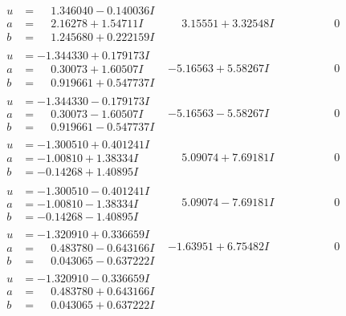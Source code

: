 \documentclass[1p]{elsarticle_modified}
\theoremstyle{definition}
\begin{document}
$$\begin{array}{c|c|c}
\begin{aligned}
u &= \phantom{-}1.346040 - 0.140036 I \\
a &= \phantom{-}2.16278 + 1.54711 I \\
b &= \phantom{-}1.245680 + 0.222159 I\end{aligned}
 & \phantom{-}3.15551 + 3.32548 I & \phantom{-0.000000 } 0 \\ \hline\begin{aligned}
u &= -1.344330 + 0.179173 I \\
a &= \phantom{-}0.30073 + 1.60507 I \\
b &= \phantom{-}0.919661 + 0.547737 I\end{aligned}
 & -5.16563 + 5.58267 I & \phantom{-0.000000 } 0 \\ \hline\begin{aligned}
u &= -1.344330 - 0.179173 I \\
a &= \phantom{-}0.30073 - 1.60507 I \\
b &= \phantom{-}0.919661 - 0.547737 I\end{aligned}
 & -5.16563 - 5.58267 I & \phantom{-0.000000 } 0 \\ \hline\begin{aligned}
u &= -1.300510 + 0.401241 I \\
a &= -1.00810 + 1.38334 I \\
b &= -0.14268 + 1.40895 I\end{aligned}
 & \phantom{-}5.09074 + 7.69181 I & \phantom{-0.000000 } 0 \\ \hline\begin{aligned}
u &= -1.300510 - 0.401241 I \\
a &= -1.00810 - 1.38334 I \\
b &= -0.14268 - 1.40895 I\end{aligned}
 & \phantom{-}5.09074 - 7.69181 I & \phantom{-0.000000 } 0 \\ \hline\begin{aligned}
u &= -1.320910 + 0.336659 I \\
a &= \phantom{-}0.483780 - 0.643166 I \\
b &= \phantom{-}0.043065 - 0.637222 I\end{aligned}
 & -1.63951 + 6.75482 I & \phantom{-0.000000 } 0 \\ \hline\begin{aligned}
u &= -1.320910 - 0.336659 I \\
a &= \phantom{-}0.483780 + 0.643166 I \\
b &= \phantom{-}0.043065 + 0.637222 I\end{aligned}

\end{array}$$
\end{document}
